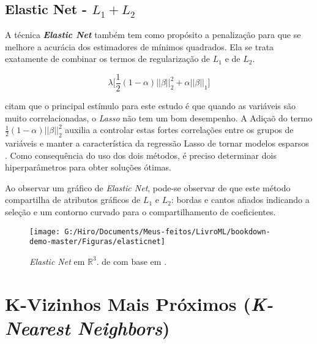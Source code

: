 \documentclass[
  openany]{book}
\begin{document}
\hypertarget{elasticnet}{%
\subsection{\texorpdfstring{Elastic Net - \(L_1+L_2\)}{Elastic Net - L\_1+L\_2}}\label{elasticnet}}

A técnica \textbf{\emph{Elastic Net}} \citep{zou2005regularization} também tem como propósito a penalização para que se melhore a acurácia dos estimadores de mínimos quadrados. Ela se trata exatamente de combinar os termos de regularização de \(L_1\) e de \(L_2\).

\begin{equation}
    \lambda\bigg[ \frac{1}{2}(1-\alpha)||\beta||_2^2+\alpha||\beta||_1\bigg]
  \label{eq:elsticnet}
\end{equation}

\citet{hastie2015statistical} citam que o principal estímulo para este estudo é que quando as variáveis são muito correlacionadas, o \emph{Lasso} não tem um bom desempenho. A Adiçaõ do termo \(\frac{1}{2}(1-\alpha)||\beta||^2_2\) auxilia a controlar estas fortes correlações entre os grupos de variáveis e manter a característica da regressão Lasso de tornar modelos esparsos \citep{silva2018tecnica}. Como consequência do uso dos dois métodos, é preciso determinar dois hiperparâmetros para obter soluções ótimas.

Ao observar um gráfico de \emph{Elastic Net}, pode-se observar de que este método compartilha de atributos gráficos de \(L_1\) e \(L_2\): bordas e cantos afiados indicando a seleção e um contorno curvado para o compartilhamento de coeficientes.

\begin{figure}

{\centering \texttt{[image: G:/Hiro/Documents/Meus-feitos/LivroML/bookdown-demo-master/Figuras/elasticnet]} 

}

\caption{\emph{Elastic Net} em \(\mathbb{R}^3\). de \citet{silva2018tecnica} com base em \citet{hastie2015statistical}.}\label{fig:elasticnet}
\end{figure}



\hypertarget{k-vizinhos-mais-pruxf3ximos-k-nearest-neighbors}{%
\section{\texorpdfstring{K-Vizinhos Mais Próximos (\emph{K-Nearest Neighbors})}{K-Vizinhos Mais Próximos (K-Nearest Neighbors)}}\label{k-vizinhos-mais-pruxf3ximos-k-nearest-neighbors}}
\end{document}
